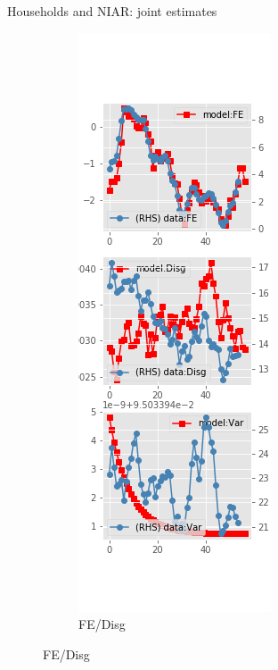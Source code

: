 \documentclass{beamer}
\begin{document}
\begin{frame}{Households and NIAR: joint estimates}
\begin{figure}[ht]
\begin{subfigure}[b]{0.2\textwidth}
		\end{subfigure}
		\hfill
		\begin{subfigure}[b]{0.2\textwidth}
			\caption{FE/Disg}
			\includegraphics[width=\textwidth, height = 0.8\textheight]{figuresDraft/sce_ni_est_joint_diag1.png}

\end{subfigure}
\end{figure}
\end{frame}
\end{document}
